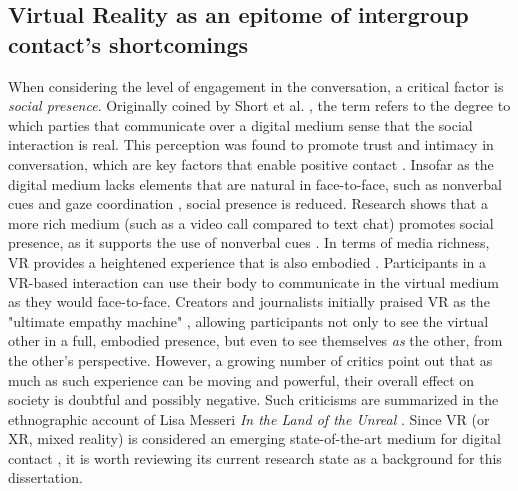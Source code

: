 \documentclass[dissertation,math,vertlayout,pdfa,colorlinks,nologo]{aaltoseries}
\begin{document}
\subsection{Virtual Reality as an epitome of intergroup contact's shortcomings}
\label{sec:vr_empathy}
When considering the level of engagement in the conversation, a critical factor is \textit{social presence}. Originally coined by Short et al. \cite{shortSocialPsychologyTelecommunications1976}, the term refers to the degree to which parties that communicate over a digital medium sense that the social interaction is real. This perception was found to promote trust and intimacy in conversation, which are key factors that enable positive contact \cite{schumannWhenComputermediatedIntergroup2017}. Insofar as the digital medium lacks elements that are natural in face-to-face, such as nonverbal cues and gaze coordination \cite{kendonConductingInteractionPatterns1990}, social presence is reduced. Research shows that a more rich medium (such as a video call compared to text chat) promotes social presence, as it supports the use of nonverbal cues \cite{newberryMediaRichnessSocial2001}. In terms of media richness, VR provides a heightened experience that is also embodied \cite{slaterInfluenceBodyMovement1998}. Participants in a VR-based interaction can use their body to communicate in the virtual medium as they would face-to-face. Creators and journalists initially praised VR as the "ultimate empathy machine" \cite{milkHowVirtualReality2015}, allowing participants not only to see the virtual other in a full, embodied presence, but even to see themselves \textit{as} the other, from the other's perspective. However, a growing number of critics point out that as much as such experience can be moving and powerful, their overall effect on society is doubtful and possibly negative. Such criticisms are summarized in the ethnographic account of Lisa Messeri \textit{In the Land of the Unreal} \cite{messeriLandUnrealVirtual2024}. Since VR (or XR, mixed reality) is considered an emerging state-of-the-art medium for digital contact \cite{chenFuturePrejudiceReduction2024}, it is worth reviewing its current research state as a background for this dissertation.
\end{document}
